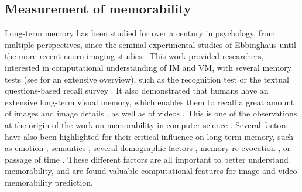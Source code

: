 \documentclass[sigconf]{acmart}
\begin{document}
\subsection{Measurement of memorability}
Long-term memory has been studied for over a century in psychology, from multiple perspectives, since the seminal experimental studies of Ebbinghaus \cite{ebbinghaus_1913_memory} until the more recent neuro-imaging studies \cite{blumenfeld_2007_prefrontal}.
This work provided researchers, interested in computational understanding of IM and VM, with several memory tests (see \cite{richardson_1988_measures} for an extensive overview), such as the recognition test \cite{isola_2011_makes,khosla_2015_understanding,han_2015_learning} or the textual questions-based recall survey \cite{shekhar_2017_show}.
It also demonstrated that humans have an extensive long-term visual memory, which enables them to recall a great amount of images \cite{standing_1973_learning} and image details \cite{brady_2008_visual}, as well as of videos \cite{furman_2007_they}.
This is one of the observations at the origin of the work on memorability in computer science \cite{isola_2011_makes}.
Several factors have also been highlighted for their critical influence on long-term memory, such as emotion \cite{kensinger_2008_memory}, semantics \cite{quillan_1966_semantic}, several demographic factors \cite{cohendet_2016_using}, memory re-evocation \cite{nadel_1997_memory}, or passage of time \cite{mcgaugh_2000_memory}.
These different factors are all important to better understand memorability, and are found valuable computational features for image and video memorability prediction.
\end{document}
